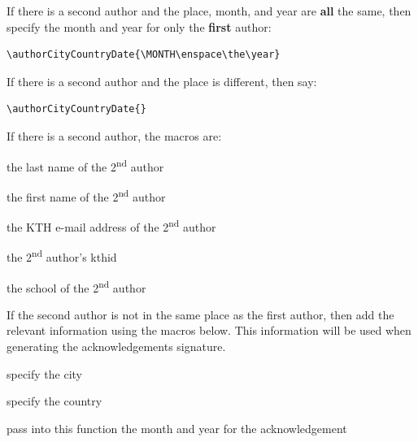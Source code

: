 \documentclass[examplethesis.tex]{subfiles}
\begin{document}
If there is a second author and the place, month, and year are \textbf{all} the same, then specify the month and year for only the \textbf{first} author:
\begin{lstlisting}[style=latexExampleForAuthors]
\authorCityCountryDate{\MONTH\enspace\the\year}
\end{lstlisting}

If there is a second author and the place is different, then say:
\begin{lstlisting}[style=latexExampleForAuthors]
\authorCityCountryDate{}
\end{lstlisting}

If there is a second author, the macros are:
\begin{description}[leftmargin=!, labelwidth =\widthof{\texttt{\textbackslash secondAuthorsFirstname\{\}}}]
\item [\texttt{\textbackslash secondAuthorsLastname\{\}}] the last name of the 2\textsuperscript{nd} author
\item [\texttt{\textbackslash secondAuthorsFirstname\{\}}] the first name of the 2\textsuperscript{nd} author
\item [\texttt{\textbackslash secondemail\{\}}] the KTH e-mail address of the 2\textsuperscript{nd} author
\item [\texttt{\textbackslash secondkthid\{\}}] the 2\textsuperscript{nd} author's kthid
\item [\texttt{\textbackslash secondAuthorsSchool\{\}}] the school of the 2\textsuperscript{nd} author
\end{description}

If the second author is not in the same place as the first author, then add the relevant information using the macros below.  This information will be used when generating the acknowledgements signature.
\begin{description}[leftmargin=!, labelwidth =\widthof{\texttt{\textbackslash secondAuthorsFirstname\{\}}}]
\item [\texttt{\textbackslash secondAuthorCity\{A City\}}]  specify the city

\item [\texttt{\textbackslash secondAuthorCountry\{A Country\}}] specify the country

\item [\texttt{\textbackslash secondAuthorCityCountryDate\{\small\textbackslash MONTH\textbackslash enspace\textbackslash the\textbackslash year\}}]  pass into this function the month and year for the acknowledgement
\end{description}
\end{document}
